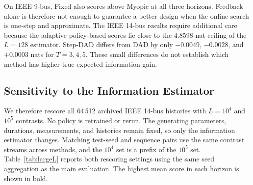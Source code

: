 \documentclass[conference,letterpaper]{IEEEtran}
\begin{document}
On IEEE 9-bus, Fixed also scores above Myopic at all three horizons. Feedback alone is therefore not enough to guarantee a better design when the online search is one-step and approximate. The IEEE 14-bus results require additional care because the adaptive policy-based scores lie close to the 4.8598-nat ceiling of the $L=128$ estimator. Step-DAD differs from DAD by only $-0.0049$, $-0.0028$, and $+0.0003$ nats for $T=3,4,5$. These small differences do not establish which method has higher true expected information gain.

\subsection{Sensitivity to the Information Estimator}\label{sec:sensitivity}
We therefore rescore all 64\,512 archived IEEE 14-bus histories with $L=10^4$ and $10^5$ contrasts. No policy is retrained or rerun. The generating parameters, durations, measurements, and histories remain fixed, so only the information estimator changes. Matching test-seed and sequence pairs use the same contrast streams across methods, and the $10^4$ set is a prefix of the $10^5$ set. Table~\ref{tab:largeL} reports both rescoring settings using the same seed aggregation as the main evaluation. The highest mean score in each horizon is shown in bold.
\end{document}
